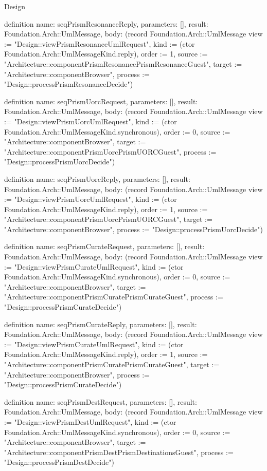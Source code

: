 \begin{lexlean}{Design}
\begin{semanticmodule}
definition{
  name: seqPrismResonanceReply,
  parameters: [],
  result: Foundation.Arch::UmlMessage,
  body: (record Foundation.Arch::UmlMessage {view := "Design::viewPrismResonanceUmlRequest", kind := (ctor Foundation.Arch::UmlMessageKind.reply), order := 1, source := "Architecture::componentPrismResonancePrismResonanceGuest", target := "Architecture::componentBrowser", process := "Design::processPrismResonanceDecide"})
}

definition{
  name: seqPrismUorcRequest,
  parameters: [],
  result: Foundation.Arch::UmlMessage,
  body: (record Foundation.Arch::UmlMessage {view := "Design::viewPrismUorcUmlRequest", kind := (ctor Foundation.Arch::UmlMessageKind.synchronous), order := 0, source := "Architecture::componentBrowser", target := "Architecture::componentPrismUorcPrismUORCGuest", process := "Design::processPrismUorcDecide"})
}

definition{
  name: seqPrismUorcReply,
  parameters: [],
  result: Foundation.Arch::UmlMessage,
  body: (record Foundation.Arch::UmlMessage {view := "Design::viewPrismUorcUmlRequest", kind := (ctor Foundation.Arch::UmlMessageKind.reply), order := 1, source := "Architecture::componentPrismUorcPrismUORCGuest", target := "Architecture::componentBrowser", process := "Design::processPrismUorcDecide"})
}

definition{
  name: seqPrismCurateRequest,
  parameters: [],
  result: Foundation.Arch::UmlMessage,
  body: (record Foundation.Arch::UmlMessage {view := "Design::viewPrismCurateUmlRequest", kind := (ctor Foundation.Arch::UmlMessageKind.synchronous), order := 0, source := "Architecture::componentBrowser", target := "Architecture::componentPrismCuratePrismCurateGuest", process := "Design::processPrismCurateDecide"})
}

definition{
  name: seqPrismCurateReply,
  parameters: [],
  result: Foundation.Arch::UmlMessage,
  body: (record Foundation.Arch::UmlMessage {view := "Design::viewPrismCurateUmlRequest", kind := (ctor Foundation.Arch::UmlMessageKind.reply), order := 1, source := "Architecture::componentPrismCuratePrismCurateGuest", target := "Architecture::componentBrowser", process := "Design::processPrismCurateDecide"})
}

definition{
  name: seqPrismDestRequest,
  parameters: [],
  result: Foundation.Arch::UmlMessage,
  body: (record Foundation.Arch::UmlMessage {view := "Design::viewPrismDestUmlRequest", kind := (ctor Foundation.Arch::UmlMessageKind.synchronous), order := 0, source := "Architecture::componentBrowser", target := "Architecture::componentPrismDestPrismDestinationsGuest", process := "Design::processPrismDestDecide"})
}


\end{semanticmodule}
\end{lexlean}
